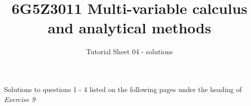 \documentclass[a4paper]{amsart}
\begin{document}
\title{6G5Z3011 Multi-variable calculus and analytical methods}
\author{Tutorial Sheet 04 - solutions}
\maketitle

Solutions to questions 1 - 4 listed on the following pages under the heading of \textit{Exercise 9}


\end{document}
